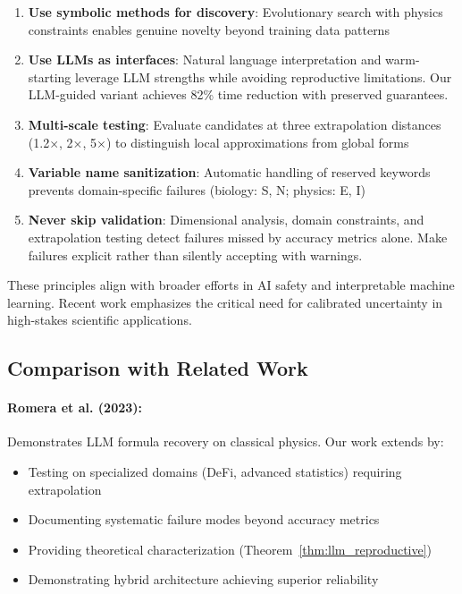 \begin{enumerate}
\item \textbf{Use symbolic methods for discovery}: Evolutionary search with physics constraints enables genuine novelty beyond training data patterns

\item \textbf{Use LLMs as interfaces}: Natural language interpretation and warm-starting leverage LLM strengths while avoiding reproductive limitations. Our LLM-guided variant achieves 82\% time reduction with preserved guarantees.

\item \textbf{Multi-scale testing}: Evaluate candidates at three extrapolation distances (1.2$\times$, 2$\times$, 5$\times$) to distinguish local approximations from global forms

\item \textbf{Variable name sanitization}: Automatic handling of reserved keywords prevents domain-specific failures (biology: S, N; physics: E, I)

\item \textbf{Never skip validation}: Dimensional analysis, domain constraints, and extrapolation testing detect failures missed by accuracy metrics alone. Make failures explicit rather than silently accepting with warnings.
\end{enumerate}

These principles align with broader efforts in AI safety and interpretable machine learning. Recent work emphasizes the critical need for calibrated uncertainty in high-stakes scientific applications.


\subsection{Comparison with Related Work}

\paragraph{Romera et al. (2023):} Demonstrates LLM formula recovery on classical physics. Our work extends by:
\begin{itemize}
\item Testing on specialized domains (DeFi, advanced statistics) requiring extrapolation
\item Documenting systematic failure modes beyond accuracy metrics
\item Providing theoretical characterization (Theorem~\ref{thm:llm_reproductive})
\item Demonstrating hybrid architecture achieving superior reliability
\end{itemize}

